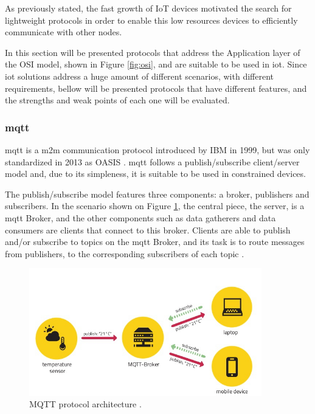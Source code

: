 As previously stated, the fast growth of IoT devices motivated the search for lightweight protocols in order to enable this low resources devices to efficiently communicate with other nodes. 

In this section will be presented protocols that address the Application layer of the OSI model, shown in Figure \ref{fig:osi}, and are suitable to be used in \ac{iot}. Since \ac{iot} solutions address a huge amount of different scenarios, with different requirements, bellow will be presented protocols that have different features, and the strengths and weak points of each one will be evaluated.

\subsubsection{\acf{mqtt}}

\acf{mqtt} is a \ac{m2m} communication protocol introduced by IBM in 1999, but was only standardized in 2013 as OASIS \cite{Al-fuqaha2015}. \ac{mqtt} follows a publish/subscribe client/server model and, due to its simpleness, it is suitable to be used in constrained devices.

The publish/subscribe model features three components: a broker, publishers and subscribers. In the scenario shown on Figure \ref{fig:mqtt}, the central piece, the server, is a \ac{mqtt} Broker, and the other components such as data gatherers and data consumers are clients that connect to this broker. Clients are able to publish and/or subscribe to topics on the \ac{mqtt} Broker, and its task is to route messages from publishers, to the corresponding subscribers of each topic \cite{Al-fuqaha2015}. 

\begin{figure}[H]
	\centering
	\includegraphics[width=0.9\textwidth]{figures/mqtt.jpg}
	\caption{MQTT protocol architecture \cite{Turan}.}
	\label{fig:mqtt}
\end{figure}

